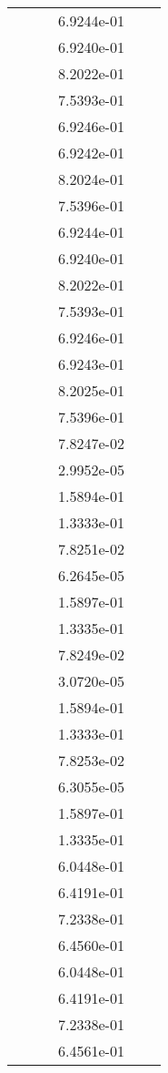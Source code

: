 \begin{xltabular}{\textwidth}{r|rS[table-format=1.3e+2]S[table-format=1.4e+2]S[table-format=1.4e+2]S[table-format=-1.5]}
&  &  & 6.9244e-01 & & \\
&  &  & 6.9240e-01 & & \\
&  &  & 8.2022e-01 & & \\
&  &  & 7.5393e-01 & & \\
&  &  & 6.9246e-01 & & \\
&  &  & 6.9242e-01 & & \\
&  &  & 8.2024e-01 & & \\
&  &  & 7.5396e-01 & & \\
&  &  & 6.9244e-01 & & \\
&  &  & 6.9240e-01 & & \\
&  &  & 8.2022e-01 & & \\
&  &  & 7.5393e-01 & & \\
&  &  & 6.9246e-01 & & \\
&  &  & 6.9243e-01 & & \\
&  &  & 8.2025e-01 & & \\
&  &  & 7.5396e-01 & & \\
&  &  & 7.8247e-02 & & \\
&  &  & 2.9952e-05 & & \\
&  &  & 1.5894e-01 & & \\
&  &  & 1.3333e-01 & & \\
&  &  & 7.8251e-02 & & \\
&  &  & 6.2645e-05 & & \\
&  &  & 1.5897e-01 & & \\
&  &  & 1.3335e-01 & & \\
&  &  & 7.8249e-02 & & \\
&  &  & 3.0720e-05 & & \\
&  &  & 1.5894e-01 & & \\
&  &  & 1.3333e-01 & & \\
&  &  & 7.8253e-02 & & \\
&  &  & 6.3055e-05 & & \\
&  &  & 1.5897e-01 & & \\
&  &  & 1.3335e-01 & & \\
&  &  & 6.0448e-01 & & \\
&  &  & 6.4191e-01 & & \\
&  &  & 7.2338e-01 & & \\
&  &  & 6.4560e-01 & & \\
&  &  & 6.0448e-01 & & \\
&  &  & 6.4191e-01 & & \\
&  &  & 7.2338e-01 & & \\
&  &  & 6.4561e-01 & & \\

\end{xltabular}
